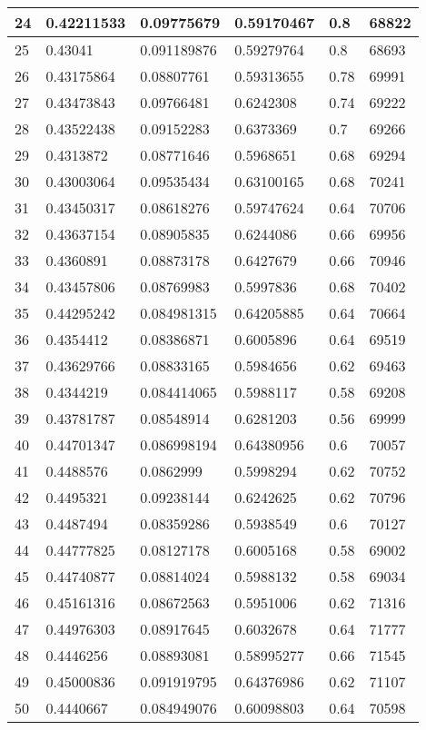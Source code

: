 \begin{longtable}{|l|l|l|l|l|l|}
24 & 0.42211533 & 0.09775679 & 0.59170467 & 0.8 & 68822 \\ \hline 
25 & 0.43041 & 0.091189876 & 0.59279764 & 0.8 & 68693 \\ \hline 
26 & 0.43175864 & 0.08807761 & 0.59313655 & 0.78 & 69991 \\ \hline 
27 & 0.43473843 & 0.09766481 & 0.6242308 & 0.74 & 69222 \\ \hline 
28 & 0.43522438 & 0.09152283 & 0.6373369 & 0.7 & 69266 \\ \hline 
29 & 0.4313872 & 0.08771646 & 0.5968651 & 0.68 & 69294 \\ \hline 
30 & 0.43003064 & 0.09535434 & 0.63100165 & 0.68 & 70241 \\ \hline 
31 & 0.43450317 & 0.08618276 & 0.59747624 & 0.64 & 70706 \\ \hline 
32 & 0.43637154 & 0.08905835 & 0.6244086 & 0.66 & 69956 \\ \hline 
33 & 0.4360891 & 0.08873178 & 0.6427679 & 0.66 & 70946 \\ \hline 
34 & 0.43457806 & 0.08769983 & 0.5997836 & 0.68 & 70402 \\ \hline 
35 & 0.44295242 & 0.084981315 & 0.64205885 & 0.64 & 70664 \\ \hline 
36 & 0.4354412 & 0.08386871 & 0.6005896 & 0.64 & 69519 \\ \hline 
37 & 0.43629766 & 0.08833165 & 0.5984656 & 0.62 & 69463 \\ \hline 
38 & 0.4344219 & 0.084414065 & 0.5988117 & 0.58 & 69208 \\ \hline 
39 & 0.43781787 & 0.08548914 & 0.6281203 & 0.56 & 69999 \\ \hline 
40 & 0.44701347 & 0.086998194 & 0.64380956 & 0.6 & 70057 \\ \hline 
41 & 0.4488576 & 0.0862999 & 0.5998294 & 0.62 & 70752 \\ \hline 
42 & 0.4495321 & 0.09238144 & 0.6242625 & 0.62 & 70796 \\ \hline 
43 & 0.4487494 & 0.08359286 & 0.5938549 & 0.6 & 70127 \\ \hline 
44 & 0.44777825 & 0.08127178 & 0.6005168 & 0.58 & 69002 \\ \hline 
45 & 0.44740877 & 0.08814024 & 0.5988132 & 0.58 & 69034 \\ \hline 
46 & 0.45161316 & 0.08672563 & 0.5951006 & 0.62 & 71316 \\ \hline 
47 & 0.44976303 & 0.08917645 & 0.6032678 & 0.64 & 71777 \\ \hline 
48 & 0.4446256 & 0.08893081 & 0.58995277 & 0.66 & 71545 \\ \hline 
49 & 0.45000836 & 0.091919795 & 0.64376986 & 0.62 & 71107 \\ \hline 
50 & 0.4440667 & 0.084949076 & 0.60098803 & 0.64 & 70598 \\ \hline 
\end{longtable}